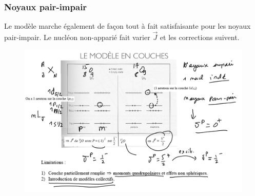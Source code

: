 \subsubsection{Noyaux pair-impair}
Le modèle marche également de façon tout à fait satisfaisante pour les noyaux pair-impair. Le nucléon non-apparié fait varier $\vec{J}$ et les corrections suivent.
\begin{figure}[H]
    \centering
    \includegraphics[width=\textwidth]{Images4/pair-impair.PNG}
\end{figure}







